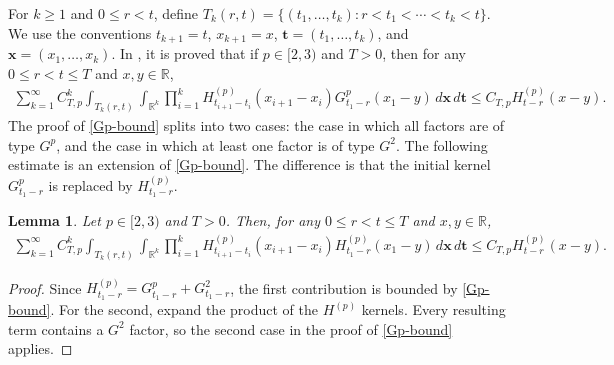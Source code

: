 \documentclass[12pt]{article}
\newtheorem{lemma}[theorem]{Lemma}
\def\bR{\mathbb{R}}
\begin{document}
\medskip




For $k\ge1$ and $0\le r<t$, define
$T_k(r,t)=\{(t_1,\ldots,t_k):r<t_1<\cdots<t_k<t\}$. We use the
conventions $t_{k+1}=t$, $x_{k+1}=x$,
$\pmb{t}=(t_1,\ldots,t_k)$, and $\pmb{x}=(x_1,\ldots,x_k)$.
In \cite{BLW26},  it is proved that if $p\in[2,3)$ and
$T>0$, then for any $0\le r<t\le T$ and $x,y\in\bR$,
\begin{align}
\label{Gp-bound}
\sum_{k=1}^{\infty}
C_{T,p}^k
\int_{T_k(r,t)}
\int_{\bR^k}
\prod_{i=1}^{k}
H_{t_{i+1}-t_i}^{(p)}(x_{i+1}-x_i)
G_{t_1-r}^p(x_1-y)
\,d\pmb{x}\,d\pmb{t}
\le
C_{T,p}H_{t-r}^{(p)}(x-y).
\end{align}
The proof of \eqref{Gp-bound} splits into two cases:
the case in which all factors are of type $G^p$, and the
case in which at least one factor is of type $G^2$.
The following estimate is an extension of
\eqref{Gp-bound}. The difference is that the initial kernel
$G_{t_1-r}^p$ is replaced by $H_{t_1-r}^{(p)}$.


\begin{lemma}
Let $p\in[2,3)$ and $T>0$. Then, for any $0\le r<t\le T$ and
$x,y\in\bR$,
\begin{align}
\label{GpG2-bound}
\sum_{k=1}^{\infty}
C_{T,p}^k
\int_{T_k(r,t)}
\int_{\bR^k}
\prod_{i=1}^{k}
H_{t_{i+1}-t_i}^{(p)}(x_{i+1}-x_i)
H_{t_1-r}^{(p)}(x_1-y)
\,d\pmb{x}\,d\pmb{t}
\le
C_{T,p}
H_{t-r}^{(p)}(x-y).
\end{align}
\end{lemma}

\begin{proof}
 Since $H_{t_1-r}^{(p)}=G_{t_1-r}^p+G_{t_1-r}^2$, the first
contribution is bounded by \eqref{Gp-bound}. For the second, expand the product
of the $H^{(p)}$ kernels. Every resulting term contains a $G^2$ factor, so the
second case in the proof of \eqref{Gp-bound} applies.
\end{proof}
\end{document}

